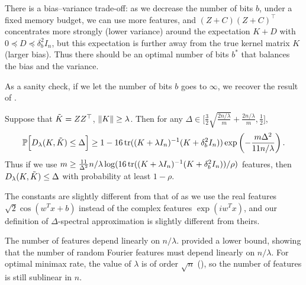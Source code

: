 There is a bias--variance trade-off: as we decrease the number of bits $b$, under
a fixed memory budget, we can use more features, and $(Z + C)(Z + C)^\top$
concentrates more strongly (lower variance) around the expectation $K + D$ with
$0 \preceq D \preceq \delta^2_b I_n$, but this expectation is further away from the true kernel
matrix $K$ (larger bias).
Thus there should be an optimal number of bits $b^*$ that balances the bias and
the variance.

As a sanity check, if we let the number of bits $b$ goes to $\infty$, we recover the
result of \citet{avron17}.
\begin{corollary}
  Suppose that $\tilde{K} = ZZ^\top$, $\|K\| \geq \lambda$.
Then for any $\Delta \in \Big[\frac{3}{2}\sqrt{\frac{2n/\lambda}{m}} + \frac{2n/\lambda}{m}, \frac{1}{2} \Big]$,
\begin{equation*}
\mathbb{P}\Big[D_{\lambda}(K,\tilde{K}) \leq \Delta\Big] \geq 1 - 16 \mathop{\rm tr}((K +
\lambda I_n)^{-1} (K + \delta^2_b I_n)) \exp \left( -\frac{m \Delta^2}{11n/\lambda} \right).
\end{equation*}
Thus if we use $m \geq \frac{11}{\Delta^2} n/\lambda \log (16 \mathop{\rm tr}((K + \lambda I_n)^{-1} (K + \delta^2_b I_n)) / \rho)$
features, then $D_\lambda(K,\tilde{K})\leq \Delta$  with probability at least $1 - \rho$.
\end{corollary}
The constants are slightly different from that of \citet{avron17} as we use the
real features $\sqrt{2} \cos(w^T x + b)$ instead of the complex features $\exp(i
w^T x)$, and our definition of $\Delta$-spectral approximation is slightly different
from theirs.

The number of features depend linearly on $n/ \lambda$.
\citet{avron17} provided a lower bound, showing that the number of random Fourier features
must depend linearly on $n / \lambda$.
For optimal minimax rate, the value of $\lambda$ is of order $\sqrt{n}$ (), so the number of features is still sublinear in $n$.

